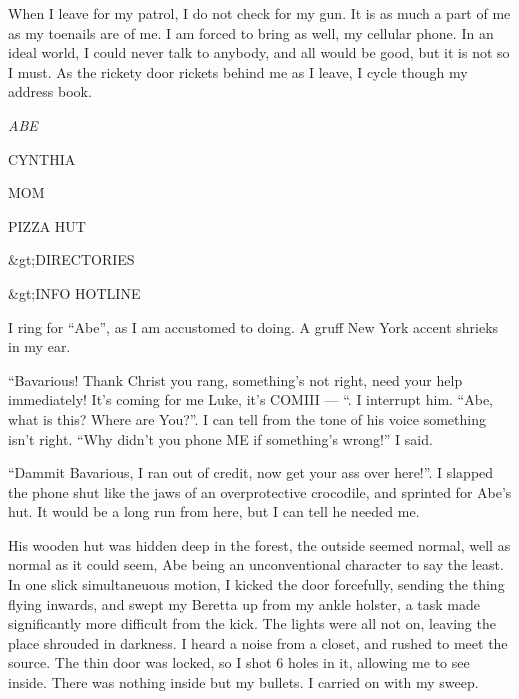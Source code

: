 When I leave for my patrol, I do not check for my gun. It is as
much a part of me as my toenails are of me. I am forced to bring as
well, my cellular phone. In an ideal world, I could never talk to
anybody, and all would be good, but it is not so I must. As the
rickety door rickets behind me as I leave, I cycle though my
address book.



{\em ABE



CYNTHIA



MOM



PIZZA HUT



&gt;DIRECTORIES



&gt;INFO HOTLINE}



I ring for ``Abe'', as I am accustomed to doing. A gruff
New York accent shrieks in my ear.



``Bavarious! Thank Christ you rang, something's not
right, need your help immediately! It's coming for me Luke,
it's COMIII --- ``. I interrupt him. ``Abe,
what is this? Where are You?''. I can tell from the tone of
his voice something isn't right. ``Why didn't you
phone ME if something's wrong!'' I said.



``Dammit Bavarious, I ran out of credit, now get your ass over
here!''. I slapped the phone shut like the jaws of an
overprotective crocodile, and sprinted for Abe's hut. It
would be a long run from here, but I can tell he needed me.



His wooden hut was hidden deep in the forest, the outside seemed
normal, well as normal as it could seem, Abe being an
unconventional character to say the least. In one slick
simultaneuous motion, I kicked the door forcefully, sending the
thing flying inwards, and swept my Beretta up from my ankle
holster, a task made significantly more difficult from the kick.
The lights were all not on, leaving the place shrouded in darkness.
I heard a noise from a closet, and rushed to meet the source. The
thin door was locked, so I shot 6 holes in it, allowing me to see
inside. There was nothing inside but my bullets. I carried on with
my sweep.



